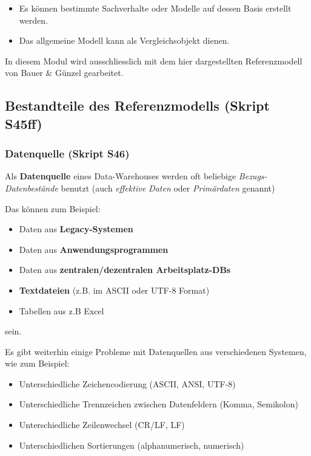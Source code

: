 \documentclass[a4paper, 11pt, nofootinbib]{article}
\begin{document}
\begin{itemize}
	\item Es können bestimmte Sachverhalte oder Modelle auf dessen Basis erstellt werden.
	\item Das allgemeine Modell kann als Vergleichsobjekt dienen.
\end{itemize}

In diesem Modul wird ausschliesslich mit dem hier dargestellten Referenzmodell von Bauer \& Günzel gearbeitet.

\vspace{3cm}

\subsection{Bestandteile des Referenzmodells (Skript S45ff)}
\subsubsection{Datenquelle (Skript S46)}
Als \textbf{Datenquelle} eines Data-Warehouses werden oft beliebige\textit{ Bezugs-Datenbestände} benutzt (auch \textit{effektive Daten} oder \textit{Primärdaten} genannt)

Das können zum Beispiel:
\begin{itemize}
	\item Daten aus \textbf{Legacy-Systemen}
	\item Daten aus \textbf{Anwendungsprogrammen}
	\item Daten aus \textbf{zentralen/dezentralen Arbeitsplatz-DBs}
	\item \textbf{Textdateien} (z.B. im ASCII oder UTF-8 Format)
	\item Tabellen aus z.B Excel
\end{itemize}

sein.

\newpage

Es gibt weiterhin einige Probleme mit Datenquellen aus verschiedenen Systemen, wie zum Beispiel:
\begin{itemize}
	\item Unterschiedliche Zeichencodierung (ASCII, ANSI, UTF-8)
	\item Unterschiedliche Trennzeichen zwischen Datenfeldern (Komma, Semikolon)
	\item Unterschiedliche Zeilenwechsel (CR/LF, LF)
	\item Unterschiedlichen Sortierungen (alphanumerisch, numerisch)
\end{itemize}
\end{document}

